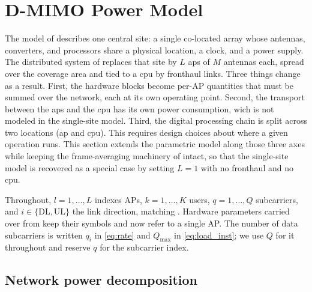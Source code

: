 \section{D-MIMO Power Model}
\label{sec:dmimo_pwr}

The model of  describes one central site: a single co-located array
whose antennas, converters, and processors share a physical location, a clock, and a power
supply. The distributed system of  replaces that site by
$L$ \glspl{ap} of $M$ antennas each, spread over the coverage area and tied to a
\gls{cpu} by fronthaul links. Three things change as a result. First, the hardware
blocks become per-AP quantities that must be summed over the network, each at its
own operating point. Second, the transport between the \glspl{ap} and the \gls{cpu} has its own power consumption, wich is not modeled in the single-site model. Third, the digital
processing chain is split across two locations (\gls{ap} and \gls{cpu}). This requires design choices about where a given operation runs. This section extends the parametric model along those three axes while keeping the frame-averaging machinery of  intact, so that the single-site model is recovered as a special case by setting $L=1$ with no fronthaul and no \gls{cpu}.

Throughout, $l=1,\dots,L$ indexes APs, $k=1,\dots,K$ users, $q=1,\dots,Q$ subcarriers, and $i\in\{\mathrm{DL},\mathrm{UL}\}$ the link direction, matching . Hardware parameters carried over from  keep their symbols and now refer to a single AP. The number of data subcarriers is written $q_{i}$ in \eqref{eq:rate} and $Q_{\max}$ in \eqref{eq:load_inst}; we use $Q$ for it throughout and reserve $q$ for the subcarrier index. 

\subsection{Network power decomposition}
\label{ssec:dmimo_structure}

